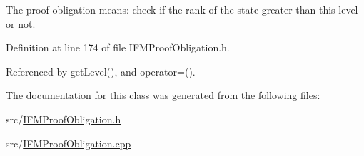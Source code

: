 The proof obligation means\-: check if the rank of the state greater than this level or not. 

Definition at line 174 of file I\-F\-M\-Proof\-Obligation.\-h.



Referenced by get\-Level(), and operator=().



The documentation for this class was generated from the following files\-:\begin{DoxyCompactItemize}
\item 
src/\hyperlink{IFMProofObligation_8h}{I\-F\-M\-Proof\-Obligation.\-h}\item 
src/\hyperlink{IFMProofObligation_8cpp}{I\-F\-M\-Proof\-Obligation.\-cpp}\end{DoxyCompactItemize}
